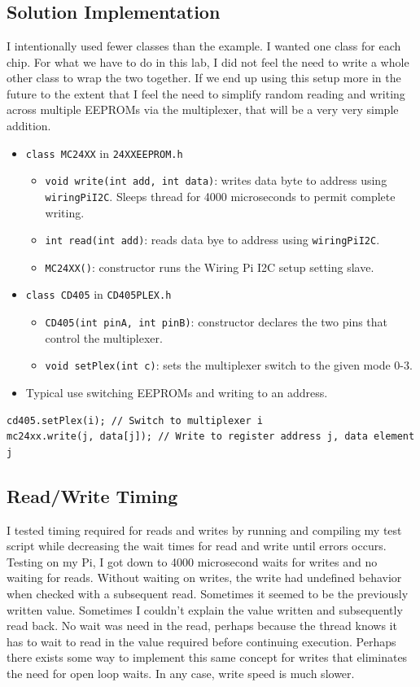 \documentclass{article}
\begin{document}
\section{}
\subsection{Solution Implementation}
I intentionally used fewer classes than the example. I wanted one class for each chip. For what we have to do in this lab, I did not feel the need to write a whole other class to wrap the two together. If we end up using this setup more in the future to the extent that I feel the need to simplify random reading and writing across multiple EEPROMs via the multiplexer, that will be a very very simple addition.
\begin{itemize}
	\item \texttt{class MC24XX} in \texttt{24XXEEPROM.h}
		\begin{itemize}
			\item \texttt{void write(int add, int data)}: writes data byte to address using \texttt{wiringPiI2C}. Sleeps thread for 4000 microseconds to permit complete writing.
			\item \texttt{int read(int add)}: reads data bye to address using \texttt{wiringPiI2C}.
			\item \texttt{MC24XX()}: constructor runs the Wiring Pi I2C setup setting slave.
		\end{itemize}
	\item \texttt{class CD405} in \texttt{CD405PLEX.h}
		\begin{itemize}
			\item \texttt{CD405(int pinA, int pinB)}: constructor declares the two pins that control the multiplexer. 
			\item \texttt{void setPlex(int c)}: sets the multiplexer switch to the given mode 0-3.
		\end{itemize}
	\item Typical use switching EEPROMs and writing to an address.
\end{itemize}
\begin{lstlisting}
cd405.setPlex(i); // Switch to multiplexer i
mc24xx.write(j, data[j]); // Write to register address j, data element j
\end{lstlisting}
\subsection{Read/Write Timing}
I tested timing required for reads and writes by running and compiling my test script while decreasing the wait times for read and write until errors occurs. Testing on my Pi, I got down to 4000 microsecond waits for writes and no waiting for reads. Without waiting on writes, the write had undefined behavior when checked with a subsequent read. Sometimes it seemed to be the previously written value. Sometimes I couldn't explain the value written and subsequently read back. No wait was need in the read, perhaps because the thread knows it has to wait to read in the value required before continuing execution. Perhaps there exists some way to implement this same concept for writes that eliminates the need for open loop waits. In any case, write speed is much slower.
\end{document}
